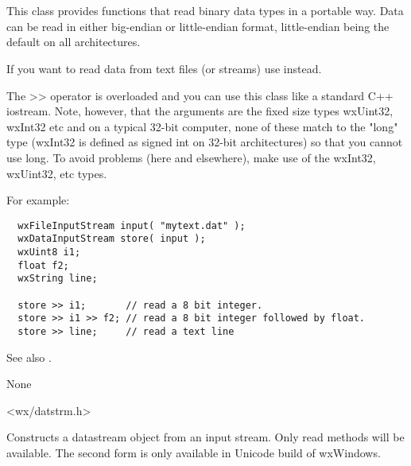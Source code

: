 \section{}\label{wxdatainputstream}

This class provides functions that read binary data types in a
portable way. Data can be read in either big-endian or little-endian
format, little-endian being the default on all architectures.

If you want to read data from text files (or streams) use 
 instead.

The >> operator is overloaded and you can use this class like a standard C++ iostream.
Note, however, that the arguments are the fixed size types wxUint32, wxInt32 etc
and on a typical 32-bit computer, none of these match to the "long" type (wxInt32
is defined as signed int on 32-bit architectures) so that you cannot use long. To avoid
problems (here and elsewhere), make use of the wxInt32, wxUint32, etc types.

For example:

\begin{verbatim}
  wxFileInputStream input( "mytext.dat" );
  wxDataInputStream store( input );
  wxUint8 i1;
  float f2;
  wxString line;

  store >> i1;       // read a 8 bit integer.
  store >> i1 >> f2; // read a 8 bit integer followed by float.
  store >> line;     // read a text line
\end{verbatim}

See also . 


None


<wx/datstrm.h>


\label{wxdatainputstreamconstr}



Constructs a datastream object from an input stream. Only read methods will
be available. The second form is only available in Unicode build of wxWindows.

